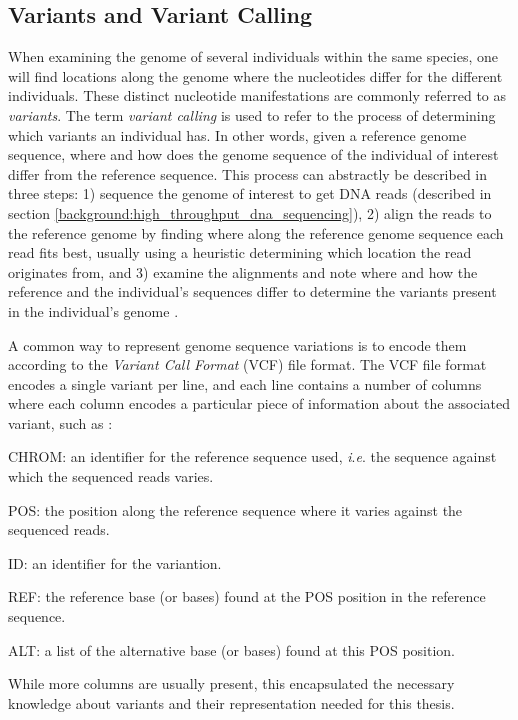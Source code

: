 \subsection{Variants and Variant Calling} \label{background:variants_and_variant_calling}
When examining the genome of several individuals within the same species, one will find locations along the genome where the nucleotides differ for the different individuals.
These distinct nucleotide manifestations are commonly referred to as \textit{variants}.
The term \textit{variant calling} is used to refer to the process of determining which variants an individual has.
In other words, given a reference genome sequence, where and how does the genome sequence of the individual of interest differ from the reference sequence.
This process can abstractly be described in three steps: 
1) sequence the genome of interest to get DNA reads (described in section \ref{background:high_throughput_dna_sequencing}), 
2) align the reads to the reference genome by finding where along the reference genome sequence each read fits best, usually using a heuristic determining which location the read originates from, and 
3) examine the alignments and note where and how the reference and the individual's sequences differ to determine the variants present in the individual's genome \cite{variant_calling}.

A common way to represent genome sequence variations is to encode them according to the \textit{Variant Call Format} (VCF) file format.
The VCF file format encodes a single variant per line, and each line contains a number of columns where each column encodes a particular piece of information about the associated variant, such as \cite{vcf}:
\begin{compactenum}
  \item
    CHROM: an identifier for the reference sequence used, \textit{i}.\textit{e}. the sequence against which the sequenced reads varies.
  \item
    POS: the position along the reference sequence where it varies against the sequenced reads.
  \item
    ID: an identifier for the variantion.
  \item
    REF: the reference base (or bases) found at the POS position in the reference sequence.
  \item
    ALT: a list of the alternative base (or bases) found at this POS position.
\end{compactenum}
While more columns are usually present, this encapsulated the necessary knowledge about variants and their representation needed for this thesis.

